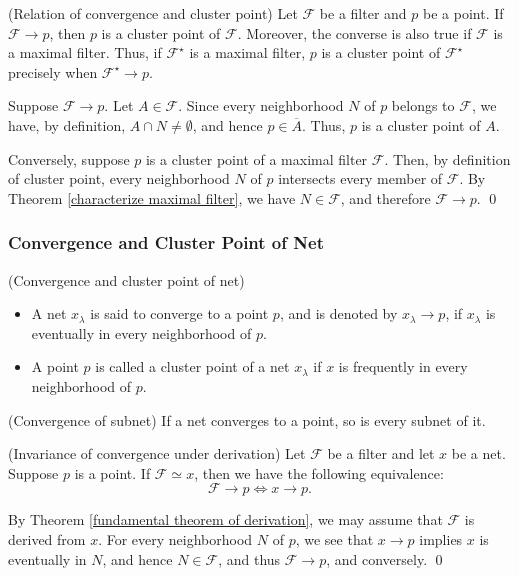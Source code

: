 \documentclass{report}
\begin{document}
\begin{lem}\label{Relation of convergence and cluster point} (Relation of convergence and cluster point)
    Let \( \mathscr{F} \) be a filter and \( p \) be a point.
    If \( \mathscr{F}\to p \), then \( p \) is a cluster point of \( \mathscr{F} \).
    Moreover, the converse is also true if \( \mathscr{F} \) is a maximal filter.
    Thus, if \( \mathscr{F}^{\star} \) is a maximal filter, \( p \) is a cluster point of \( \mathscr{F}^{\star} \) precisely when \( \mathscr{F}^{\star} \to p\).
\end{lem}
\begin{prf}
    Suppose \( \mathscr{F} \to p \). Let \( A \in \mathscr{F} \).
    Since every neighborhood \( N \) of \( p \) belongs to \( \mathscr{F} \), we have, by definition, \( A \cap N \neq \emptyset \), and hence \( p \in \overline{A} \). Thus, \( p \) is a cluster point of \( A \).

    Conversely, suppose \( p \) is a cluster point of a maximal filter \( \mathscr{F} \). Then, by definition of cluster point, every neighborhood \( N \) of \( p \) intersects every member of \( \mathscr{F} \). By Theorem \ref{characterize maximal filter}, we have \( N \in \mathscr{F} \), and therefore \( \mathscr{F} \to p \).
    \qed\end{prf}


\subsubsection{Convergence and Cluster Point of Net}
\begin{dfn} (Convergence and cluster point of net)
    \begin{itemize}
        \item A net \( x_{\lambda} \) is said to converge to a point \( p \), and is denoted by \( x_{\lambda}\to p \), if \( x_{\lambda} \) is eventually in every neighborhood of \( p \).
        \item A point \( p \) is called a cluster point of a net \( x_{\lambda} \) if \( x \) is frequently in every neighborhood of \( p \).
    \end{itemize}
\end{dfn}

\begin{exe} (Convergence of subnet)
    If a net converges to a point, so is every subnet of it.
\end{exe}

\begin{thm}\label{invariance convergence} (Invariance of convergence under derivation)
    Let \( \mathscr{F} \) be a filter and let \( x \) be a net. Suppose \( p \) is a point. If \( \mathscr{F} \simeq x \), then we have the following equivalence:
    \[
        \mathscr{F} \to p \iff x \to p.
    \]
\end{thm}
\begin{prf}
    By Theorem \ref{fundamental theorem of derivation}, we may assume that \( \mathscr{F} \) is derived from \( x \). For every neighborhood \( N \) of \( p \), we see that \( x \to p \) implies \( x \) is eventually in \( N \), and hence \( N \in \mathscr{F} \), and thus \( \mathscr{F}\to p \), and conversely.
    \qed\end{prf}
\end{document}
